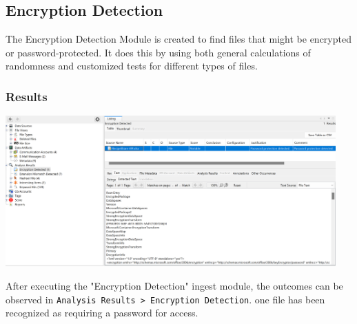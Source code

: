 \documentclass{article}
\begin{document}
\subsection{Encryption Detection}
The Encryption Detection Module is created to find files that might be encrypted or password-protected. It does this by using both general calculations of randomness and customized tests for different types of files.

\subsubsection*{Results}
\begin{center}
    \includegraphics[width=0.95\textwidth]{3/3.10/Results of Encryption Detection ingest module.png}
\end{center}

After executing the "Encryption Detection" ingest module, the outcomes can be observed in \texttt{Analysis Results > Encryption Detection}. one file has been recognized as requiring a password for access.
\end{document}
